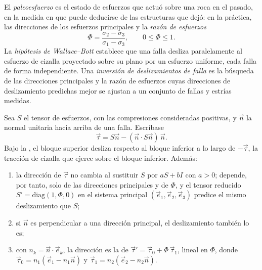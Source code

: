 \begin{definition}\label{def:b3:structural-analysis:palaeostress}
El \emph{paleoesfuerzo} es el estado de esfuerzos que actuó
sobre una roca en el pasado, en la medida en que puede deducirse de las estructuras que dejó:
en la práctica, las direcciones de los esfuerzos principales y la
\emph{razón de esfuerzos}
\[
  \Phi = \frac{\sigma_2 - \sigma_3}{\sigma_1 - \sigma_3}, \qquad 0 \le \Phi
  \le 1 .
\]
La \emph{hipótesis de Wallace--Bott} establece
que una falla desliza paralelamente al esfuerzo de cizalla proyectado sobre su plano por un
esfuerzo uniforme, cada falla de forma independiente. Una \emph{inversión de
deslizamientos de falla} es la búsqueda de las
direcciones principales y la razón de esfuerzos cuyas direcciones de deslizamiento predichas mejor se ajustan a un conjunto
de fallas y estrías medidas.
\end{definition}

\begin{theorem}\label{thm:b3:structural-analysis:wallace-bott}
Sea $S$ el tensor de esfuerzos, con las compresiones consideradas positivas, y $\vec n$ la
normal unitaria hacia arriba de una falla. Escríbase
\[
  \vec\tau = S\vec n - (\vec n\cdot S\vec n)\,\vec n .
\]
Bajo la , el bloque superior desliza respecto al
bloque inferior a lo largo de $-\vec\tau$, la tracción de cizalla que ejerce sobre el
bloque inferior. Además:
\begin{enumerate}[label=(\alph*)]
  \item la dirección de $\vec\tau$ no cambia al sustituir $S$ por $aS +
        bI$ con $a > 0$; depende, por tanto, solo de las direcciones
        principales y de $\Phi$, y el tensor reducido $S' =
        \mathrm{diag}(1, \Phi, 0)$ en el sistema principal $(\vec e_1, \vec
        e_2, \vec e_3)$ predice el mismo deslizamiento que $S$;
  \item si $\vec n$ es perpendicular a una dirección principal, el deslizamiento
        también lo es;
  \item con $n_k = \vec n\cdot\vec e_k$, la dirección es la de $\vec\tau'
        = \vec\tau_0 + \Phi\,\vec\tau_1$, lineal en $\Phi$, donde $\vec\tau_0
        = n_1(\vec e_1 - n_1\vec n)$ y $\vec\tau_1 = n_2(\vec e_2 - n_2\vec
        n)$.
\end{enumerate}
\end{theorem}

